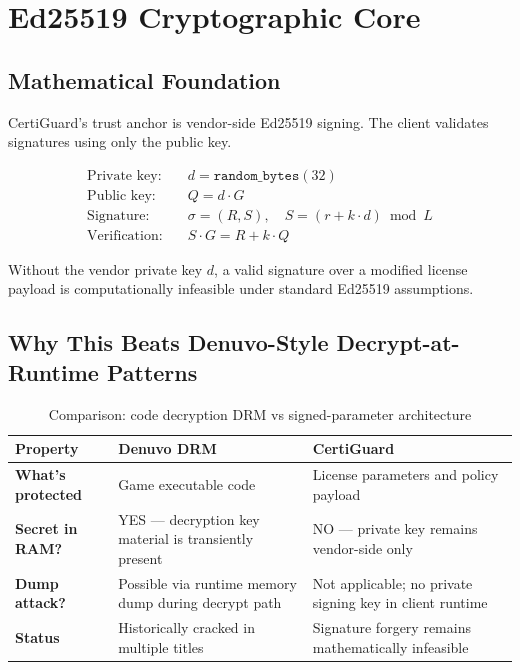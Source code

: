 \documentclass[11pt,a4paper]{article}
\begin{document}
\section{Ed25519 Cryptographic Core}

\subsection{Mathematical Foundation}
CertiGuard's trust anchor is vendor-side Ed25519 signing. The client validates signatures using only the public key.

\begin{align*}
\text{Private key:}\quad & d = \texttt{random\_bytes}(32) \\
\text{Public key:}\quad & Q = d \cdot G \\
\text{Signature:}\quad & \sigma = (R,S), \quad S = (r + k\cdot d)\bmod L \\
\text{Verification:}\quad & S\cdot G = R + k\cdot Q
\end{align*}

\begin{tcolorbox}[certicallout,title=\textbf{Security Implication}]
Without the vendor private key $d$, a valid signature over a modified license payload is computationally infeasible under standard Ed25519 assumptions.
\end{tcolorbox}

\subsection{Why This Beats Denuvo-Style Decrypt-at-Runtime Patterns}
\begin{table}[H]
\centering
\caption{Comparison: code decryption DRM vs signed-parameter architecture}
\begin{tabularx}{\textwidth}{>{\bfseries}lYY}
\toprule
Property & Denuvo DRM & CertiGuard \\
\midrule
What's protected & Game executable code & License parameters and policy payload \\
Secret in RAM? & YES --- decryption key material is transiently present & NO --- private key remains vendor-side only \\
Dump attack? & Possible via runtime memory dump during decrypt path & Not applicable; no private signing key in client runtime \\
Status & Historically cracked in multiple titles & Signature forgery remains mathematically infeasible \\
\bottomrule
\end{tabularx}
\end{table}
\end{document}
